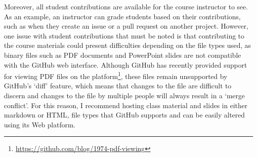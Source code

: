 Moreover, all student contributions are available for the course instructor to see. As an example, an instructor can grade students based on their contributions, such as when they create an issue or a pull request on another project. However, one issue with student contributions that must be noted is that contributing to the course materials could present difficulties depending on the file types used, as binary files such as PDF documents and PowerPoint slides are not compatible with the GitHub web interface. Although GitHub has recently provided support for viewing PDF files on the platform\footnote{\url{https://github.com/blog/1974-pdf-viewing}}, these files remain unsupported by GitHub's `diff' feature, which means that changes to the file are difficult to discern and changes to the file by multiple people will always result in a `merge conflict'. For this reason, I recommend hosting class material and slides in either markdown or HTML, file types that GitHub supports and can be easily altered using its Web platform.
